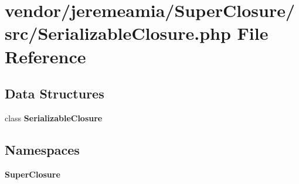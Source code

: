 \section{vendor/jeremeamia/\+Super\+Closure/src/\+Serializable\+Closure.php File Reference}
\label{_serializable_closure_8php}
\subsection*{Data Structures}
\begin{DoxyCompactItemize}
\item 
class {\bf Serializable\+Closure}
\end{DoxyCompactItemize}
\subsection*{Namespaces}
\begin{DoxyCompactItemize}
\item 
 {\bf Super\+Closure}
\end{DoxyCompactItemize}
